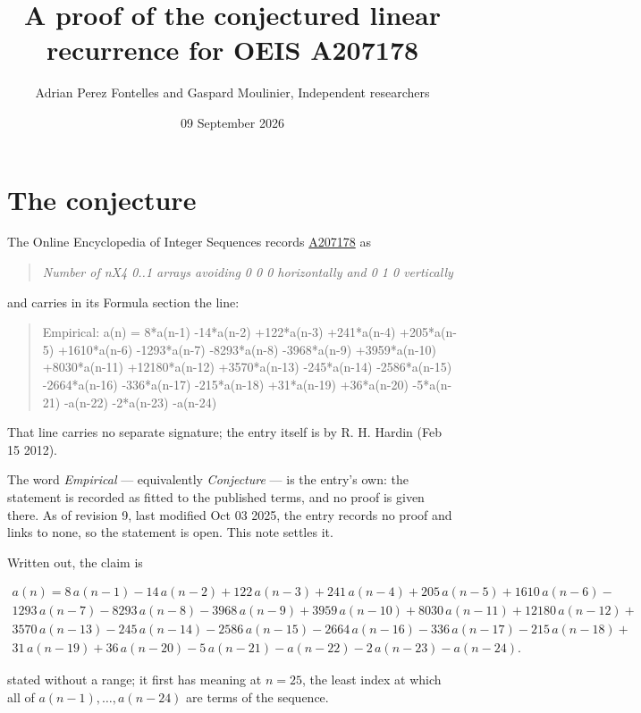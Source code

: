 \documentclass[11pt]{article}
\title{A proof of the conjectured linear recurrence for OEIS A207178}
\author{Adrian Perez Fontelles and Gaspard Moulinier, Independent researchers}
\date{09 September 2026}
\theoremstyle{definition}
\begin{document}
\maketitle
\section{The conjecture}

The Online Encyclopedia of Integer Sequences records \href{https://oeis.org/A207178}{A207178} as

\begin{quote}\itshape Number of nX4 0..1 arrays avoiding 0 0 0 horizontally and 0 1 0 vertically\end{quote}

and carries in its Formula section the line:

\begin{quote}\ttfamily Empirical: a(n) = 8*a(n-1) -14*a(n-2) +122*a(n-3) +241*a(n-4) +205*a(n-5) +1610*a(n-6) -1293*a(n-7) -8293*a(n-8) -3968*a(n-9) +3959*a(n-10) +8030*a(n-11) +12180*a(n-12) +3570*a(n-13) -245*a(n-14) -2586*a(n-15) -2664*a(n-16) -336*a(n-17) -215*a(n-18) +31*a(n-19) +36*a(n-20) -5*a(n-21) -a(n-22) -2*a(n-23) -a(n-24)\end{quote}

That line carries no separate signature; the entry itself is by R. H. Hardin (Feb 15 2012).

The word {\itshape Empirical} --- equivalently {\itshape Conjecture} --- is the entry's own: the statement is recorded as fitted to the published terms, and no proof is given there. As of revision 9, last modified Oct 03 2025, the entry records no proof and links to none, so the statement is open. This note settles it.

Written out, the claim is

\begin{multline*} a(n) = 8\,a(n-1) - 14\,a(n-2) + 122\,a(n-3) + 241\,a(n-4) + 205\,a(n-5) + 1610\,a(n-6) - \\ 1293\,a(n-7) - 8293\,a(n-8) - 3968\,a(n-9) + 3959\,a(n-10) + 8030\,a(n-11) + 12180\,a(n-12) + \\ 3570\,a(n-13) - 245\,a(n-14) - 2586\,a(n-15) - 2664\,a(n-16) - 336\,a(n-17) - 215\,a(n-18) + \\ 31\,a(n-19) + 36\,a(n-20) - 5\,a(n-21) - a(n-22) - 2\,a(n-23) - a(n-24). \end{multline*}

stated without a range; it first has meaning at $n = 25$, the least index at which all of $a(n-1),\dots,a(n-24)$ are terms of the sequence.
\end{document}
